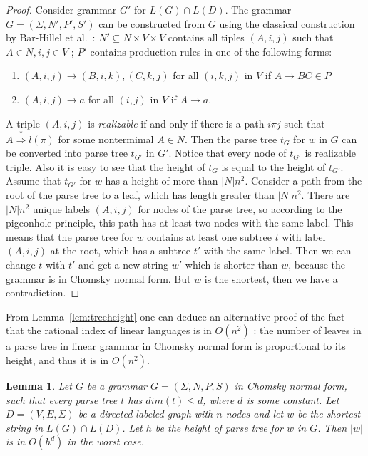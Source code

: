 \documentclass[11pt,a4paper]{article} %
\newtheorem{lemma}{Lemma}
\begin{document}
\begin{proof}
Consider grammar $G'$ for $L(G)\cap L(D)$. The grammar $G = (\Sigma, N', P', S')$ can be constructed from $G$ using the classical construction by Bar-Hillel et al.~\cite{BarHillel}: $N' \subseteq N \times V \times V $  contains all tiples $(A, i, j)$ such that $A \in N, i, j \in V$ ; $P'$ contains production rules in one of the following forms:
\begin{enumerate}
\item $(A, i, j) \rightarrow (B, i, k), (C, k, j)$ for all $(i, k, j)$ in $V$  if $A \rightarrow BC \in P$
\item $(A, i, j) \rightarrow a$ for all $(i, j)$ in $V$ if $A \rightarrow a$.
\end{enumerate}
A triple $(A, i, j)$ is \textit{realizable} if and only if there is a path $i\pi j$ such that $A \stackrel {*}{\Rightarrow } l(\pi)$ for some nontermimal $A \in N$. Then the parse tree $t_G$ for $w$ in $G$ can be converted into parse tree $t_{G'}$ in $G'$. Notice that every node of $t_{G'}$ is realizable triple. Also it is easy to see that the height of $t_G$ is equal to the height of $t_{G'}$. Assume that $t_{G'}$ for $w$ has a height of more than $|N|n^2$. Consider a path from the root of the parse tree to a leaf, which has length greater than $|N|n^2$. There are $|N|n^2$ unique labels $(A, i, j)$ for nodes of the parse tree, so according to the pigeonhole principle, this path has at least two nodes with the same label. This means that the parse tree for $w$ contains at least one subtree $t$ with label $(A, i, j)$ at the root, which has a subtree $t'$ with the same label. Then we can change $t$ with $t'$ and get a new string $w'$ which is shorter than $w$, because the grammar is in Chomsky normal form. But $w$ is the shortest, then we have a contradiction.

\end{proof}
From Lemma~\ref{lem:treeheight} one can deduce an alternative proof of the fact that the rational index of linear languages is in $O(n^2)$ \cite{RatBasic}: the number of leaves in a parse tree in linear grammar in Chomsky normal form is proportional to its height, and thus it is in $O(n^2)$.
\begin{lemma}
\label{oscbnddim}
Let $G$ be a grammar $G = (\Sigma, N, P, S)$ in Chomsky normal form, such that every parse tree $t$ has $dim(t) \le d$, where $d$ is some constant. Let $D=(V, E, \Sigma)$ be a directed labeled graph with $n$ nodes and let $w$ be the shortest string in $L(G)\cap L(D)$. Let $h$ be the height of parse tree for $w$ in $G$. Then $|w|$ is in $O(h^d)$ in the worst case.
\end{lemma}
\end{document}
